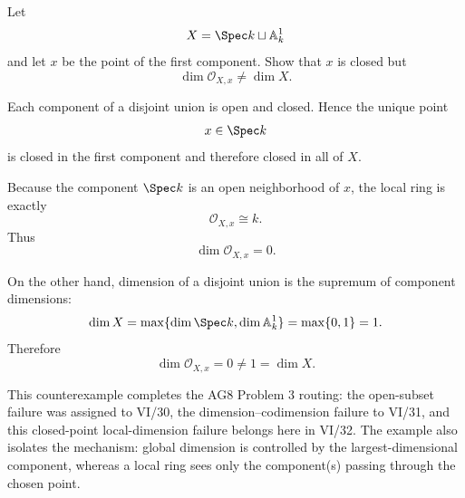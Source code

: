 \begin{problem}\label{prob:vi32-02}
Let
\[
X=\Spec k\sqcup\mathbb A^1_k
\]
and let \(x\) be the point of the first component. Show that \(x\) is closed but
\[
\dim\mathcal O_{X,x}\ne\dim X.
\]

\end{problem}

\ifdefined\FullProblemDossiers
\begin{solution}
Each component of a disjoint union is open and closed. Hence the unique point
\[
x\in\Spec k
\]
is closed in the first component and therefore closed in all of \(X\).

Because the component \(\Spec k\) is an open neighborhood of \(x\), the local ring is exactly
\[
\mathcal O_{X,x}\cong k.
\]
Thus
\[
\dim\mathcal O_{X,x}=0.
\]

On the other hand, dimension of a disjoint union is the supremum of component dimensions:
\[
\dim X
=
\max\{\dim\Spec k,\dim\mathbb A^1_k\}
=
\max\{0,1\}
=
1.
\]
Therefore
\[
\boxed{
\dim\mathcal O_{X,x}=0\ne1=\dim X.
}
\]

This counterexample completes the AG8 Problem 3 routing: the open-subset failure was assigned to VI/30, the
dimension--codimension failure to VI/31, and this closed-point local-dimension failure belongs here in VI/32.  The
example also isolates the mechanism: global dimension is controlled by the largest-dimensional component, whereas a
local ring sees only the component(s) passing through the chosen point.
\end{solution}
\fi
